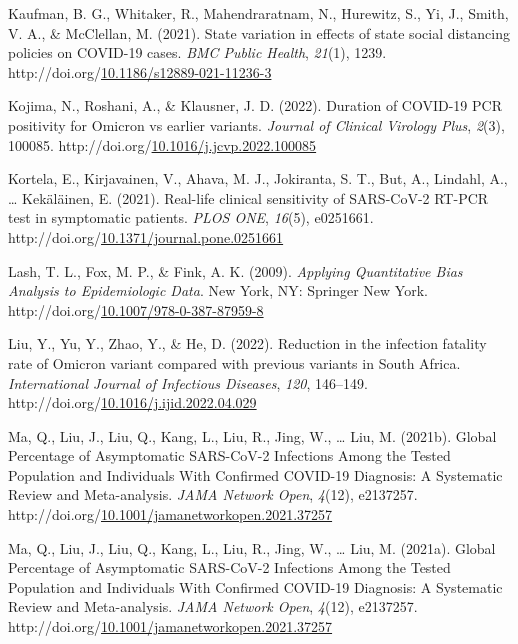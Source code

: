 \documentclass[12pt,twoside]{smiththesis}
\newlength{\cslhangindent}
\newenvironment{CSLReferences}[2] %
 {%
\setlength{\parindent}{0pt}
\ifodd #1 \everypar{\setlength{\hangindent}{\cslhangindent}}\ignorespaces\fi
\ifnum #2 > 0
\setlength{\parskip}{#2\baselineskip}
  \fi
}%
{}
\begin{document}
\begin{CSLReferences}{1}{0}
\leavevmode{}%
Kaufman, B. G., Whitaker, R., Mahendraratnam, N., Hurewitz, S., Yi, J., Smith, V. A., \& McClellan, M. (2021). State variation in effects of state social distancing policies on {COVID-19} cases. \emph{BMC Public Health}, \emph{21}(1), 1239. http://doi.org/\href{https://doi.org/10.1186/s12889-021-11236-3}{10.1186/s12889-021-11236-3}

\leavevmode{}%
Kojima, N., Roshani, A., \& Klausner, J. D. (2022). Duration of {COVID-19 PCR} positivity for {Omicron} vs earlier variants. \emph{Journal of Clinical Virology Plus}, \emph{2}(3), 100085. http://doi.org/\href{https://doi.org/10.1016/j.jcvp.2022.100085}{10.1016/j.jcvp.2022.100085}

\leavevmode{}%
Kortela, E., Kirjavainen, V., Ahava, M. J., Jokiranta, S. T., But, A., Lindahl, A., \ldots{} Kekäläinen, E. (2021). Real-life clinical sensitivity of {SARS-CoV-2 RT-PCR} test in symptomatic patients. \emph{PLOS ONE}, \emph{16}(5), e0251661. http://doi.org/\href{https://doi.org/10.1371/journal.pone.0251661}{10.1371/journal.pone.0251661}

\leavevmode{}%
Lash, T. L., Fox, M. P., \& Fink, A. K. (2009). \emph{Applying {Quantitative Bias Analysis} to {Epidemiologic Data}}. {New York, NY}: {Springer New York}. http://doi.org/\href{https://doi.org/10.1007/978-0-387-87959-8}{10.1007/978-0-387-87959-8}

\leavevmode{}%
Liu, Y., Yu, Y., Zhao, Y., \& He, D. (2022). Reduction in the infection fatality rate of {Omicron} variant compared with previous variants in {South Africa}. \emph{International Journal of Infectious Diseases}, \emph{120}, 146--149. http://doi.org/\href{https://doi.org/10.1016/j.ijid.2022.04.029}{10.1016/j.ijid.2022.04.029}

\leavevmode{}%
Ma, Q., Liu, J., Liu, Q., Kang, L., Liu, R., Jing, W., \ldots{} Liu, M. (2021b). Global {Percentage} of {Asymptomatic SARS-CoV-2 Infections Among} the {Tested Population} and {Individuals With Confirmed COVID-19 Diagnosis}: {A Systematic Review} and {Meta-analysis}. \emph{JAMA Network Open}, \emph{4}(12), e2137257. http://doi.org/\href{https://doi.org/10.1001/jamanetworkopen.2021.37257}{10.1001/jamanetworkopen.2021.37257}

\leavevmode{}%
Ma, Q., Liu, J., Liu, Q., Kang, L., Liu, R., Jing, W., \ldots{} Liu, M. (2021a). Global {Percentage} of {Asymptomatic SARS-CoV-2 Infections Among} the {Tested Population} and {Individuals With Confirmed COVID-19 Diagnosis}: {A Systematic Review} and {Meta-analysis}. \emph{JAMA Network Open}, \emph{4}(12), e2137257. http://doi.org/\href{https://doi.org/10.1001/jamanetworkopen.2021.37257}{10.1001/jamanetworkopen.2021.37257}


\end{CSLReferences}
\end{document}
